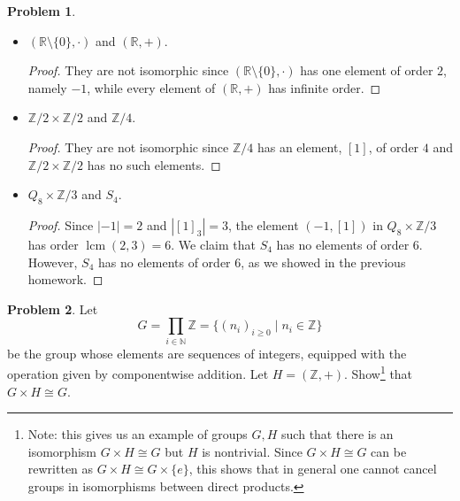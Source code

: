 \documentclass[11pt]{article}
\DeclareMathOperator{\lcm}{lcm}
\newcommand{\ZZ}{\mathbb{Z}}
\newcommand{\R}{\mathbb{R}}
\newcommand{\N}{\mathbb{N}}
\theoremstyle{definition}
\newtheorem{problem}{Problem}
\begin{document}
\begin{problem}
\begin{enumerate}
\begin{itemize}
\item $(\R \setminus \{0\}, \cdot)$ and $(\R, +)$.

\begin{proof}
	They are not isomorphic since $(\R \setminus \{0\}, \cdot)$ has one element of order $2$, namely $-1$, while every element of $(\R, +)$ has infinite order.
\end{proof}

\item $\ZZ/2 \times \ZZ/2$ and $\ZZ/4$.

\begin{proof}
They are not isomorphic since $\ZZ/4$ has an element, $[1]$, of order $4$ and $\ZZ/2 \times \ZZ/2$ has no such elements.
\end{proof}


\item $Q_8 \times \ZZ/3$ and $S_4$.

\begin{proof}
Since $|-1| = 2$ and $|[1]_3| = 3$, the element $(-1, [1])$ in $Q_8 \times \ZZ/3$ has order $\lcm(2,3) = 6$. We claim that $S_4$ has no elements of order $6$. However, $S_4$ has no elements of order $6$, as we showed in the previous homework.
\end{proof}


\end{itemize}
\end{enumerate}
\end{problem} 





\begin{problem}
Let 
$$G=\prod_{i\in \N} \ZZ = \{ (n_i)_{i \geqslant 0} \mid n_i \in \ZZ \}$$ 
be the group whose elements are sequences of integers, equipped with the operation given by componentwise addition. Let $H=(\ZZ,+)$. Show\footnote{Note: this gives us an example of groups $G,H$ such that there is an isomorphism $G\times H\cong G$ but $H$ is nontrivial. Since $G\times H \cong G$ can be rewritten as $G\times H\cong G\times \{e\}$, this shows that in general one cannot cancel groups in isomorphisms between direct products.} that $G\times H \cong G$.
\end{problem}
\end{document}

